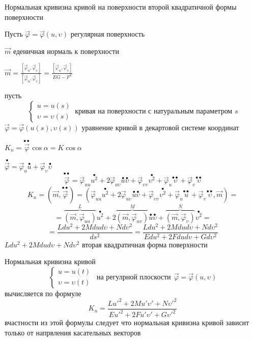 \begin{title}[\Large]
  Нормальная кривизна кривой на поверхности второй квадратичной формы
  поверхности
\end{title}

Пусть $\vec \varphi = \vec \varphi(u, \upsilon)$ регулярная поверхность

$\vec m$ еденичная нормаль к поверхности

$\vec m = \frac{[\vec \varphi_u, \vec \varphi_{\upsilon}]}{[\vec \varphi_u,
\vec \varphi_{\upsilon}]} = \frac{[\vec \varphi_u, \vec \varphi_{\upsilon}]}
{EG - F^2}$

пусть
$$
\left\{
\begin{array}{c}
  u = u(s) \\
  \upsilon = \upsilon(s)
\end{array}
\right. ~ \text{кривая на поверхности с натуральным параметром $s$}
$$
$\vec \varphi = \vec \varphi(u(s), \upsilon(s))$ уравнение кривой в декартовой
системе координат

$K_n = \stackrel{\bullet \bullet}{\vec \varphi} \cos \alpha = K \cos \alpha$

$\stackrel{\bullet}{\vec \varphi} = \vec \varphi_u \stackrel{\bullet}{u} +
\vec \varphi_{\upsilon} \stackrel{\bullet}{\upsilon}$
$$
\stackrel{\bullet \bullet}{\vec \varphi} = \vec \varphi_{uu}
\stackrel{\bullet}{u^2} + 2\vec \varphi_{u\upsilon}\stackrel{\bullet}{u}
\stackrel{\bullet}{\upsilon} + \vec \varphi_{\upsilon \upsilon}
\stackrel{\bullet}{\upsilon^2}
+ \vec \varphi_u \stackrel{\bullet \bullet}{\upsilon} +
\vec \varphi_{\upsilon} \stackrel{\bullet \bullet}{\upsilon}
$$
$$
K_n = (\vec m, \stackrel{\bullet \bullet}{\vec \varphi}) = (\vec \varphi_{uu}
\stackrel{\bullet}{u^2} + 2\vec \varphi_{u\upsilon}\stackrel{\bullet}{u}
\stackrel{\bullet}{\upsilon} + \vec \varphi_{\upsilon \upsilon}
\stackrel{\bullet}{\upsilon^2}
+ \vec \varphi_u \stackrel{\bullet \bullet}{u} +
\vec \varphi_{\upsilon} \stackrel{\bullet \bullet}{\upsilon}, \vec m) =
$$
$$
= \overbrace{(\vec m, \vec \varphi_{uu})}^L \stackrel{\bullet}{u^2} +
2\overbrace{(\vec m, \vec \varphi_{u\upsilon})}^M \stackrel{\bullet}{u}
\stackrel{\bullet}{\upsilon} + \overbrace{(\vec m, \vec \varphi_{\upsilon})}^N
\stackrel{\bullet}{\upsilon^2} =
$$
$$
= \frac{Ldu^2 + 2Mdud\upsilon + Nd\upsilon^2}{ds^2}
= \frac{Ldu^2 + 2Mdud\upsilon + Nd\upsilon^2}{Edu^2 + 2Fdu d\upsilon +
Gd\upsilon^2}
$$
$Ldu^2 + 2Mdud\upsilon + Nd\upsilon^2$ вторая квадратичная форма поверхности

\begin{theorem}
  Нормальная кривизна кривой
  $$
  \left\{
  \begin{array}{c}
    u = u(t) \\
    \upsilon = \upsilon(t)
  \end{array}
  \right. ~~ \text{на регулрной плоскости} ~~ \vec \varphi = \vec \varphi(u,
  \upsilon)
  $$
  вычисляется по формуле
  $$
  K_n = \frac{Lu'^2 + 2Mu'\upsilon' + N\upsilon'^2}{Eu'^2 + 2Fu'\upsilon' +
  G\upsilon'^2}
  $$
  вчастности из этой формулы следует что нормальная кривизна кривой зависит
  только от напрвления касательных векторов
\end{theorem}

